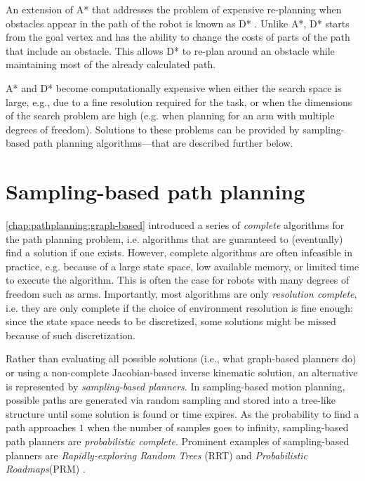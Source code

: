 An extension of A* that addresses the problem of expensive re-planning when obstacles appear in the path of the robot is known as D* \cite{stentz1994optimal}. Unlike A*, D* starts from the goal vertex and has the ability to change the costs of parts of the path that include an obstacle. This allows D* to re-plan around an obstacle while maintaining most of the already calculated path.

A* and D* become computationally expensive when either the search space is large, e.g., due to a fine resolution required for the task, or when the dimensions of the search problem are high (e.g. when planning for an arm with multiple degrees of freedom). Solutions to these problems can be provided by sampling-based path planning algorithms---that are described further below.

\section{Sampling-based path planning}

\cref{chap:pathplanning:graph-based} introduced a series of \textsl{complete} algorithms for the path planning problem, i.e. algorithms that are guaranteed to (eventually) find a solution if one exists.
However, complete algorithms are often infeasible in practice, e.g. because of a large state space, low available memory, or limited time to execute the algorithm. This is often the case for robots with many degrees of freedom such as arms.
Importantly, most algorithms are only \textsl{resolution complete}, i.e. they are only complete if the choice of environment resolution is fine enough: since the state space needs to be discretized, some solutions might be missed because of such discretization.

Rather than evaluating all possible solutions (i.e., what graph-based planners do) or using a non-complete Jacobian-based inverse kinematic solution, an alternative is represented by \textsl{sampling-based planners}.
In sampling-based motion planning, possible paths are generated via random sampling and stored into a tree-like structure until some solution is found or time expires. As the probability to find a path approaches $1$ when the number of samples goes to infinity, sampling-based path planners are \textsl{probabilistic complete}. Prominent examples of sampling-based planners are \textsl{Rapidly-exploring Random Trees} (RRT)\cite{lavalle1998rapidly} and \textsl{Probabilistic Roadmaps}(PRM) \cite{kavraki1996probabilistic}.

